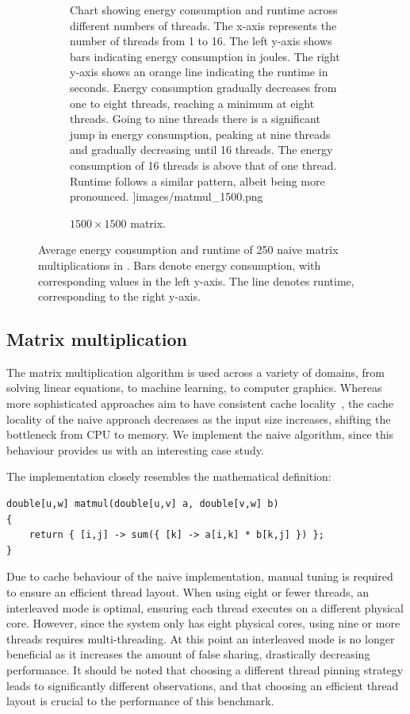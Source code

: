 \begin{figure}[!ht]
\begin{subfigure}{0.33\linewidth}
{            Chart showing energy consumption and runtime across different numbers of threads. The
            x-axis represents the number of threads from 1 to 16. The left y-axis shows bars
            indicating energy consumption in joules. The right y-axis shows an orange line
            indicating the runtime in seconds. Energy consumption gradually decreases from one to
            eight threads, reaching a minimum at eight threads. Going to nine threads there is a
            significant jump in energy consumption, peaking at nine threads and gradually decreasing
            until 16 threads. The energy consumption of 16 threads is above that of one thread.
            Runtime follows a similar pattern, albeit being more pronounced.
        }]{images/matmul_1500.png}
        \caption{$1500 \times 1500$ matrix.}
        \label{fig:matmul3}
    \end{subfigure}%
    \caption{Average energy consumption and runtime of 250 naive matrix multiplications in \sac{}.
    Bars denote energy consumption, with corresponding values in the left y-axis.
    The line denotes runtime, corresponding to the right y-axis.}
    \label{fig:matmul}
\end{figure}

\subsection{Matrix multiplication}

The matrix multiplication algorithm is used across a variety of domains, from solving linear
equations, to machine learning, to computer graphics. Whereas more sophisticated approaches aim to
have consistent cache locality~\cite{sac-blocking}, the cache locality of the naive approach
decreases as the input size increases, shifting the bottleneck from CPU to memory. We implement the
naive algorithm, since this behaviour provides us with an interesting case study.

The \sac{} implementation closely resembles the mathematical definition:
\begin{verbatim}
double[u,w] matmul(double[u,v] a, double[v,w] b)
{
    return { [i,j] -> sum({ [k] -> a[i,k] * b[k,j] }) };
}
\end{verbatim}

Due to cache behaviour of the naive implementation, manual tuning is required to ensure an efficient
thread layout. When using eight or fewer threads, an interleaved mode is optimal, ensuring each
thread executes on a different physical core. However, since the system only has eight physical
cores, using nine or more threads requires multi-threading. At this point an interleaved mode is no
longer beneficial as it increases the amount of false sharing, drastically decreasing performance.
It should be noted that choosing a different thread pinning strategy leads to significantly
different observations, and that choosing an efficient thread layout is crucial to the performance
of this benchmark.


